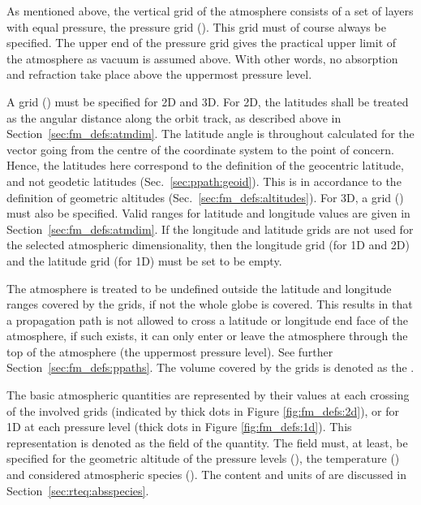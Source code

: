 As mentioned above, the vertical grid of the atmosphere consists of a
set of layers with equal pressure, the pressure grid
().  This grid must of course always be specified.
The upper end of the pressure grid gives the practical upper limit of
the atmosphere as vacuum is assumed above. With other words, no
absorption and refraction take place above the uppermost pressure
level.

A  grid () must be specified for 2D and
3D. For 2D, the latitudes shall be treated as the angular distance along the
orbit track, as described above in Section~\ref{sec:fm_defs:atmdim}. The
latitude angle is throughout calculated for the vector going from the centre of
the coordinate system to the point of concern. Hence, the latitudes here
correspond to the definition of the geocentric latitude, and not geodetic
latitudes (Sec.~\ref{sec:ppath:geoid}). This is in accordance to the
definition of geometric altitudes (Sec.~\ref{sec:fm_defs:altitudes}). For
3D, a  grid () must also be specified.
Valid ranges for latitude and longitude values are given in
Section~\ref{sec:fm_defs:atmdim}. If the longitude and latitude grids are not
used for the selected atmospheric dimensionality, then the longitude grid (for
1D and 2D) and the latitude grid (for 1D) must be set to be empty.

The atmosphere is treated to be undefined outside the latitude and longitude
ranges covered by the grids, if not the whole globe is covered. This results in
that a propagation path is not allowed to cross a latitude or longitude end
face of the atmosphere, if such exists, it can only enter or leave the
atmosphere through the top of the atmosphere (the uppermost pressure level).
See further Section~\ref{sec:fm_defs:ppaths}. The volume covered by the grids
is denoted as the .

The basic atmospheric quantities are represented by their values at each
crossing of the involved grids (indicated by thick dots in Figure
\ref{fig:fm_defs:2d}), or for 1D at each pressure level (thick dots in Figure
\ref{fig:fm_defs:1d}). This representation is denoted as the
field of the quantity. The field must, at least, be
specified for the geometric altitude of the pressure levels
(), the temperature () and considered
atmospheric species (). The content and units of
 are discussed in
Section~\ref{sec:rteq:absspecies}.

